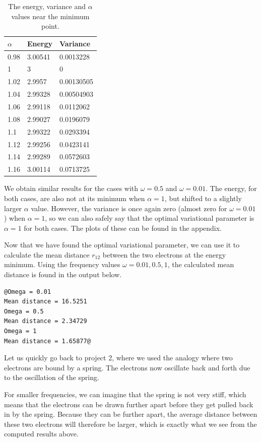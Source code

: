 \documentclass[12pt]{article}
\begin{document}
\begin{table}
\begin{center}
	\begin{tabular}{| l | l | l |}
	\hline 
	$\alpha$ & Energy & Variance \\ \hline
	0.98 & 3.00541 & 0.0013228 \\
	1 & 3 & 0 \\
	1.02 & 2.9957 & 0.00130505 \\
	1.04 & 2.99328 & 0.00504903 \\
	1.06 & 2.99118 & 0.0112062 \\
	1.08 & 2.99027 & 0.0196079 \\
	1.1 & 2.99322 & 0.0293394 \\
	1.12 & 2.99256 & 0.0423141 \\
	1.14 & 2.99289 & 0.0572603 \\
	1.16 & 3.00114 & 0.0713725 \\ \hline
	\end{tabular}
\caption{The energy, variance and $\alpha$ values near the minimum point.}
\end{center}
\label{table:AlphaMinimum_omega1}
\end{table}
We obtain similar results for the cases with $\omega = 0.5$ and $\omega = 0.01$. The energy, for both cases, are also not at its minimum when $\alpha = 1$, but shifted to a slightly larger $\alpha$ value. However, the variance is once again zero (almost zero for $\omega = 0.01$) when $\alpha = 1$, so we can also safely say that the optimal variational parameter is $\alpha = 1$ for both cases. The plots of these can be found in the appendix.

Now that we have found the optimal variational parameter, we can use it to calculate the mean distance $r_{12}$ between the two electrons at the energy minimum. Using the frequency values $\omega = 0.01, 0.5, 1$, the calculated mean distance is found in the output below.
\begin{lstlisting}
@Omega = 0.01
Mean distance = 16.5251
Omega = 0.5
Mean distance = 2.34729
Omega = 1
Mean distance = 1.65877@
\end{lstlisting}
Let us quickly go back to project 2, where we used the analogy where two electrons are bound by a spring. The electrons now oscillate back and forth due to the oscillation of the spring. 

For smaller frequencies, we can imagine that the spring is not very stiff, which means that the electrons can be drawn further apart before they get pulled back in by the spring. Because they can be further apart, the average distance between these two electrons will therefore be larger, which is exactly what we see from the computed results above.
\end{document}

